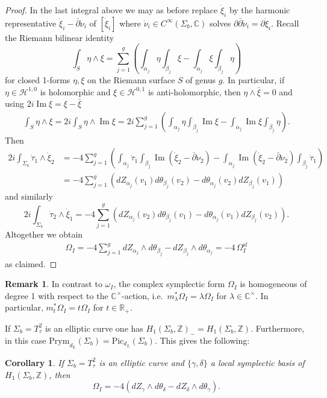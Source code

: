 \documentclass[12pt,letterpaper,reqno]{amsart}
\newtheorem{cor}[thm]{Corollary}
\theoremstyle{remark}
\theoremstyle{definition}
\newtheorem{rem}[thm]{Remark}
\numberwithin{thm}{section}
\numberwithin{equation}{section}
\numberwithin{figure}{section}
\newcommand{\R}{\ensuremath{\mathbb R}}
\newcommand{\C}{\ensuremath{\mathbb C}}
\newcommand{\Z}{\ensuremath{\mathbb Z}}
\newcommand{\semif}{\ensuremath{\mathrm{sf}}}
\DeclareMathOperator{\im}{Im}
\begin{document}
\begin{proof}
In the last integral above we may as before replace $\dot\xi_i$ by the harmonic representative $\dot \xi_i - \bar\partial \dot \nu_i$ of $[\dot \xi_i]$ where $\dot \nu_i \in C^\infty(\Sigma_b,\C)$ solves $\partial\bar\partial \dot \nu_i = \partial\dot \xi_i$. Recall the Riemann bilinear identity
\[
\int_S \eta \wedge \xi  = \sum_{j=1}^g \left( \int_{\alpha_j} \eta  \int_{\beta_j} \xi - \int_{\alpha_j} \xi  \int_{\beta_j} \eta \right)
\]
for closed 1-forms $\eta, \xi$ on the Riemann surface $S$ of genus $g$. In particular, if $\eta \in \mathcal{H}^{1,0}$ is holomorphic and $\xi \in\mathcal{H}^{0,1}$ is anti-holomorphic, then $\eta \wedge \bar \xi = 0$ and using $2i \im \xi = \xi - \bar \xi$
\begin{align*}
	\int_S \eta \wedge \xi = 2i \int_S \eta \wedge \im \xi = 2i\sum_{j=1}^g \left( \int_{\alpha_j} \eta \int_{\beta_j} \im \xi - \int_{\alpha_j} \im \xi  \int_{\beta_j} \eta \right).
\end{align*}
Then
\begin{align*}
 2i \int_{\Sigma_b} \dot \tau_1\wedge  \dot\xi_2 &= -4 \sum_{j=1}^g \left( \int_{\alpha_j} \dot\tau_1 \int_{\beta_j} \im  (\dot\xi_2 - \bar\partial\dot\nu_2)       - \int_{\alpha_j} \im (\dot\xi_2 - \bar\partial\dot\nu_2)  \int_{\beta_j} \dot\tau_1 \right)\\
 & = -4\sum_{j=1}^g \left( dZ_{\alpha_j}(v_1)d\theta_{\beta_j}(v_2) - d\theta_{\alpha_j}(v_2)dZ_{\beta_j}(v_1)   \right)
\end{align*}
and similarly
\[
2i \int_{\Sigma_b} \dot \tau_2\wedge  \dot\xi_1 = -4 \sum_{j=1}^g \left( dZ_{\alpha_j}(v_2)d\theta_{\beta_j}(v_1) - d\theta_{\alpha_j}(v_1)dZ_{\beta_j}(v_2)   \right).
 \]
Altogether we obtain 
\begin{align*}
\Omega_I = -4 \sum_{j=1}^g d Z_{\alpha_j}\wedge d \theta _{\beta_j} - d Z_{\beta_j}\wedge d \theta_{\alpha_j} = -4 \, \Omega_I^{\semif}
\end{align*}
as claimed. 
\end{proof}

\begin{rem}
In contrast to $\omega_I$, the complex symplectic form $\Omega_I$ is homogeneous of degree 1 with respect to the $\C^\times$-action, i.e.\ 
$m_\lambda^* \Omega_I = \lambda \Omega_I$ for $\lambda \in \C^\times$. In particular, 	$m_t^*\Omega_I = t \Omega_I$ for $t \in \R_+$. \end{rem}

If $\Sigma_b = T^2_\tau$ is an elliptic curve  one has $H_1(\Sigma_b, \Z)_- = H_1(\Sigma_b, \Z)$. Furthermore, in this case $\mathrm{Prym}_{d_L}(\Sigma_b) = \mathrm{Pic}_{d_L}(\Sigma_b)$. This gives the following:
\begin{cor}\label{cplx_symp_ell}
If 	$\Sigma_b = T^2_\tau$ is an elliptic curve and $\{\gamma, \delta\}$ a local symplectic basis of $H_1(\Sigma_b, \Z)$, then
\[
\Omega_ I = -4 (dZ_\gamma \wedge d\theta_\delta - dZ_\delta \wedge d\theta_\gamma).
\]
\end{cor}
\end{document}
